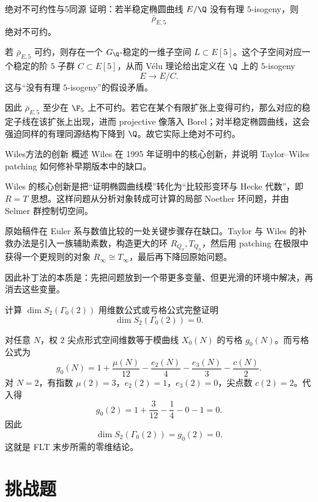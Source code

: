 \begin{problem}{绝对不可约性与5同源}
证明：若半稳定椭圆曲线 $E/\Q$ 没有有理 $5$-isogeny，则
\[
\bar\rho_{E,5}
\]
绝对不可约。
\end{problem}
\begin{solution}
若 $\bar\rho_{E,5}$ 可约，则存在一个 $G_\Q$-稳定的一维子空间 $L\subset E[5]$。这个子空间对应一个稳定的阶 $5$ 子群 $C\subset E[5]$，从而 Vélu 理论给出定义在 $\Q$ 上的 $5$-isogeny
\[
E\to E/C.
\]
这与“没有有理 $5$-isogeny”的假设矛盾。

因此 $\bar\rho_{E,5}$ 至少在 $\F_5$ 上不可约。若它在某个有限扩张上变得可约，那么对应的稳定子线在该扩张上出现，进而 projective 像落入 Borel；对半稳定椭圆曲线，这会强迫同样的有理同源结构下降到 $\Q$。故它实际上绝对不可约。
\end{solution}

\begin{problem}{Wiles方法的创新}
概述 Wiles 在 1995 年证明中的核心创新，并说明 Taylor--Wiles patching 如何修补早期版本中的缺口。
\end{problem}
\begin{solution}
Wiles 的核心创新是把“证明椭圆曲线模”转化为“比较形变环与 Hecke 代数”，即 $R=T$ 思想。这样问题从分析对象转成可计算的局部 Noether 环问题，并由 Selmer 群控制切空间。

原始稿件在 Euler 系与数值比较的一处关键步骤存在缺口。Taylor 与 Wiles 的补救办法是引入一族辅助素数，构造更大的环 $R_{Q_n},T_{Q_n}$，然后用 patching 在极限中获得一个更规则的对象 $R_\infty\cong T_\infty$，最后再下降回原始问题。

因此补丁法的本质是：先把问题放到一个带更多变量、但更光滑的环境中解决，再消去这些变量。
\end{solution}

\begin{problem}{计算 $\dim S_2(\Gamma_0(2))$}
用维数公式或亏格公式完整证明
\[
\dim S_2(\Gamma_0(2))=0.
\]
\end{problem}
\begin{solution}
对任意 $N$，权 $2$ 尖点形式空间维数等于模曲线 $X_0(N)$ 的亏格 $g_0(N)$。而亏格公式为
\[
g_0(N)=1+\frac{\mu(N)}{12}-\frac{e_2(N)}{4}-\frac{e_3(N)}{3}-\frac{c(N)}{2}.
\]
对 $N=2$，有指数 $\mu(2)=3$，$e_2(2)=1$，$e_3(2)=0$，尖点数 $c(2)=2$。代入得
\[
g_0(2)=1+\frac{3}{12}-\frac14-0-1=0.
\]
因此
\[
\dim S_2(\Gamma_0(2))=g_0(2)=0.
\]
这就是 FLT 末步所需的零维结论。
\end{solution}

\section{挑战题 \hard}

